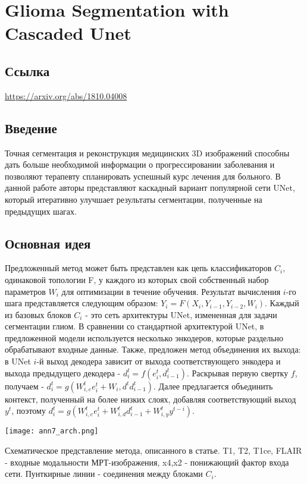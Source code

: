 \section{Glioma Segmentation with Cascaded Unet}

\subsection*{Ссылка} \url{https://arxiv.org/abs/1810.04008}
\subsection*{Введение}
Точная сегментация и реконструкция медицинских 3D изображений способны дать 
больше необходимой информации о прогрессировании заболевания и позволяют терапевту 
спланировать успешный курс лечения для больного. В данной работе авторы представляют
каскадный вариант популярной сети UNet, который итеративно улучшает результаты сегментации, 
полученные на предыдущих шагах. 
\subsection*{Основная идея}
Предложенный метод может быть представлен как цепь классификаторов 
\(C_i\), одинаковой топологии F, у каждого из которых свой собственный 
набор параметров \(W_i\) для оптимизации в течение обучения.
Результат вычисления \(i\)-го шага представляется следующим образом: 
\(Y_i=F(X_i,Y_{i-1}, Y_{i-2}, W_i)\). Каждый из базовых блоков \(C_i\) - это
сеть архитектуры UNet, измененная для задачи сегментации глиом. В сравнении 
со стандартной архитектурой UNet, в предложенной модели используется несколько 
энкодеров, которые раздельно обрабатывают входные данные. Также, предложен метод объединения 
их выхода: в UNet \(i\)-й выход декодера зависит от выхода соответствующего 
энкодера и выхода предыдущего декодера - \(d_i^{t}=f(e_i^{t}, d^{t}_{i-1})\). 
Раскрывая первую свертку \(f\), получаем - \(d_i^{t}=g(W_{i,e}^{t}e_i^{t}+W_{i},d^{t}d^{t}_{i-1})\).
Далее предлагается объединить контекст, полученный на более низких слоях, 
добавляя соответствующий выход \(y^t\), поэтому \(d_i^{t}=g(W_{i,e}^{t}e_i^{t}+W_{i,d}^{t}d^{t}_{i-1}+W_{i,y}^{t}y^{t-i})\).
\\
\begin{minipage}{1.0\linewidth}
    \begin{center}
        \texttt{[image: ann7\_arch.png]}
        \caption{Схематическое представление метода, описанного в статье.
        T1, T2, T1ce, FLAIR - входные модальности МРТ-изображения, x4,x2 - понижающий
        фактор входа сети. Пунткирные линии - соединения между блоками \(C_i\).}
    \end{center}
\end{minipage}


